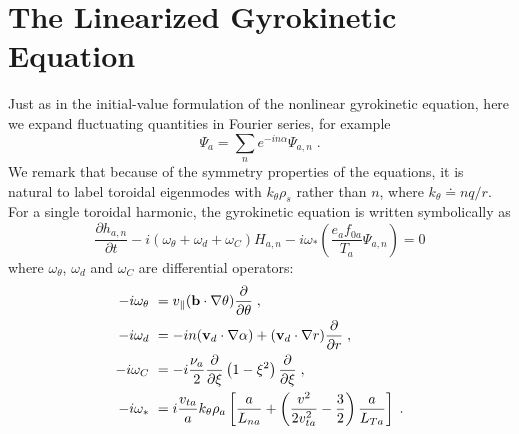 \section{The Linearized Gyrokinetic Equation}

Just as in the initial-value formulation of the nonlinear gyrokinetic 
equation, here we expand fluctuating quantities in Fourier series, for 
example
%
\begin{equation}
\Psi_a = \sum_n e^{-in\alpha} \Psi_{a,n} \; .
\end{equation}
%
We remark that because of the symmetry properties of the equations, 
it is natural to label toroidal eigenmodes with $k_\theta \rho_s$
rather than $n$, where $k_\theta \doteq n q/r$.  For a single toroidal 
harmonic, the gyrokinetic equation is written symbolically as
%
\begin{equation}
\frac{\partial h_{a,n}}{\partial t} - i(\omega_\theta + \omega_d + \omega_C) H_{a,n} 
-i \omega_* (\frac{e_a f_{0a}}{T_a} \Psi_{a,n}) = 0
\end{equation}
%
where $\omega_\theta$, $\omega_d$ and $\omega_C$ are differential operators:
%
\begin{align}
-i \omega_\theta &~= 
 v_\parallel (\mathbf{b} \cdot \nabla\theta) \frac{\partial}{\partial\theta} \; , 
\label{eq.omtheta}\\
-i \omega_d &~= -i n (\mathbf{v}_d \cdot \nabla\alpha) + 
 (\mathbf{v}_d\cdot\nabla r)\frac{\partial}{\partial r} \; , 
\label{eq.omdrift}\\
-i \omega_C &~= -i \frac{\nu_a}{2} \frac{\partial}{\partial\xi} 
 \left( 1-\xi^2\right) \frac{\partial}{\partial\xi} \; ,
\label{eq.omcoll}\\
-i \omega_* &~= i \frac{v_{ta}}{a} k_\theta \rho_a \left[ 
\frac{a}{L_{na}} + 
 \left(\frac{v^2}{2 v_{ta}^2}-\frac{3}{2} \right) \frac{a}{L_{Ta}} \right] \; .
\label{eq.omstar}
\end{align}

